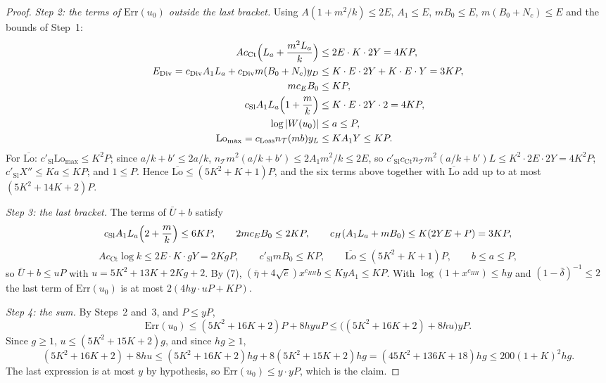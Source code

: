 \begin{proof}
\emph{Step 2: the terms of $\mathrm{Err}(u_0)$ outside the last bracket.} Using
$A(1+m^2/k)\leq2E$, $A_1\leq E$, $mB_0\leq E$, $m(B_0+N_c)\leq E$ and the bounds of
Step~1:
\begin{align*}
 Ac_{\mathrm{Ct}}\Bigl(L_a+\frac{m^2L_a}k\Bigr)&\leq2E\cdot K\cdot2Y=4KP,\\
 E_{\mathrm{Div}}=c_{\mathrm{Div}}A_1L_a+c_{\mathrm{Div}}m(B_0+N_c)y_D
 &\leq K\cdot E\cdot2Y+K\cdot E\cdot Y=3KP,\\
 mc_EB_0&\leq KP,\\
 c_{\mathrm{Sl}}A_1L_a\Bigl(1+\frac mk\Bigr)&\leq K\cdot E\cdot2Y\cdot2=4KP,\\
 \log|W(u_0)|&\leq a\leq P,\\
 \mathrm{Lo}_{\max}=c_{\mathrm{Loss}}n_{\mathcal T}(mb)y_L&\leq KA_1Y\leq KP.
\end{align*}
For $\overline{\mathrm{Lo}}$: $c'_{\mathrm{Sl}}\mathrm{Lo}_{\max}\leq K^2P$; since
$a/k+b'\leq2a/k$, $n_{\mathcal T}m^2(a/k+b')\leq2A_1m^2/k\leq2E$, so
$c'_{\mathrm{Sl}}c_{\mathrm{Ct}}n_{\mathcal T}m^2(a/k+b')L\leq K^2\cdot2E\cdot2Y=4K^2P$;
$c'_{\mathrm{Sl}}X''\leq Ka\leq KP$; and $1\leq P$. Hence
$\overline{\mathrm{Lo}}\leq(5K^2+K+1)P$, and the six terms above together with
$\overline{\mathrm{Lo}}$ add up to at most $(5K^2+14K+2)P$.

\emph{Step 3: the last bracket.} The terms of $\bar U+b$ satisfy
\[
 c_{\mathrm{Sl}}A_1L_a\Bigl(2+\frac mk\Bigr)\leq6KP,\qquad
 2mc_EB_0\leq2KP,\qquad c_H(A_1L_a+mB_0)\leq K(2YE+P)=3KP,
\]
\[
 Ac_{\mathrm{Ct}}\log k\leq2E\cdot K\cdot gY=2KgP,\qquad
 c'_{\mathrm{Sl}}mB_0\leq KP,\qquad \overline{\mathrm{Lo}}\leq(5K^2+K+1)P,\qquad
 b\leq a\leq P,
\]
so $\bar U+b\leq uP$ with $u=5K^2+13K+2Kg+2$. By (7),
$(\bar\eta+4\sqrt{\bar e})x^{c_{HH}}b\leq KyA_1\leq KP$. With
$\log(1+x^{c_{HH}})\leq hy$ and $(1-\bar\delta)^{-1}\leq2$ the last term of
$\mathrm{Err}(u_0)$ is at most $2(4hy\cdot uP+KP)$.

\emph{Step 4: the sum.} By Steps~2 and~3, and $P\leq yP$,
\[
 \mathrm{Err}(u_0)\leq(5K^2+16K+2)P+8hyuP\leq\bigl((5K^2+16K+2)+8hu\bigr)yP.
\]
Since $g\geq1$, $u\leq(5K^2+15K+2)g$, and since $hg\geq1$,
\[
 (5K^2+16K+2)+8hu\leq(5K^2+16K+2)hg+8(5K^2+15K+2)hg=(45K^2+136K+18)hg
 \leq200(1+K)^2hg.
\]
The last expression is at most $y$ by hypothesis, so
$\mathrm{Err}(u_0)\leq y\cdot yP$, which is the claim.
\end{proof}

